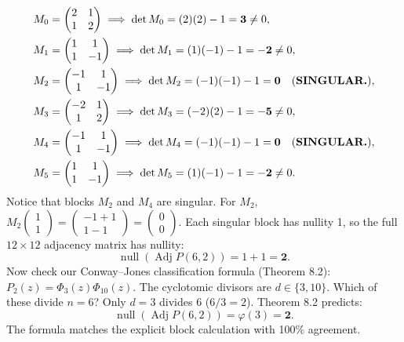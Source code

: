 \documentclass[11pt]{article}
\begin{document}
\begin{align}
  M_0 &= \begin{pmatrix} 2 & 1 \\ 1 & 2 \end{pmatrix} \implies \det M_0 = (2)(2) - 1 = \mathbf{3} \ne 0, \\
  M_1 &= \begin{pmatrix} 1 & 1 \\ 1 & -1 \end{pmatrix} \implies \det M_1 = (1)(-1) - 1 = \mathbf{-2} \ne 0, \\
  M_2 &= \begin{pmatrix} -1 & 1 \\ 1 & -1 \end{pmatrix} \implies \det M_2 = (-1)(-1) - 1 = \mathbf{0} \quad \text{(\textbf{SINGULAR.})}, \\
  M_3 &= \begin{pmatrix} -2 & 1 \\ 1 & 2 \end{pmatrix} \implies \det M_3 = (-2)(2) - 1 = \mathbf{-5} \ne 0, \\
  M_4 &= \begin{pmatrix} -1 & 1 \\ 1 & -1 \end{pmatrix} \implies \det M_4 = (-1)(-1) - 1 = \mathbf{0} \quad \text{(\textbf{SINGULAR.})}, \\
  M_5 &= \begin{pmatrix} 1 & 1 \\ 1 & -1 \end{pmatrix} \implies \det M_5 = (1)(-1) - 1 = \mathbf{-2} \ne 0.
\end{align}
Notice that blocks $M_2$ and $M_4$ are singular. 
For $M_2$, $M_2 \begin{pmatrix} 1 \\ 1 \end{pmatrix} = \begin{pmatrix} -1+1 \\ 1-1 \end{pmatrix} = \begin{pmatrix} 0 \\ 0 \end{pmatrix}$.
Each singular block has nullity 1, so the full $12 \times 12$ adjacency matrix has nullity:
\begin{equation}
  \operatorname{null}(\operatorname{Adj} P(6,2)) = 1 + 1 = \mathbf{2}.
\end{equation}
Now check our Conway--Jones classification formula (Theorem 8.2):
$P_2(z) = \Phi_3(z) \Phi_{10}(z)$.
The cyclotomic divisors are $d \in \{3, 10\}$.
Which of these divide $n=6$? Only $d=3$ divides $6$ ($6/3 = 2$).
Theorem 8.2 predicts:
\begin{equation}
  \operatorname{null}(\operatorname{Adj} P(6,2)) = \varphi(3) = \mathbf{2}.
\end{equation}
The formula matches the explicit block calculation with 100\% agreement.
\end{document}
